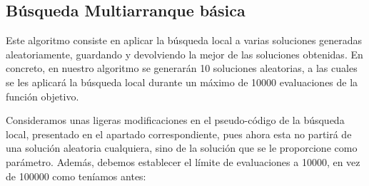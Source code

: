 \documentclass[11pt,a4paper]{article}
\begin{document}
\subsection{Búsqueda Multiarranque básica}

Este algoritmo consiste en aplicar la búsqueda local a varias soluciones generadas aleatoriamente, guardando y devolviendo la mejor de las soluciones obtenidas. En concreto, en nuestro algoritmo se generarán 10 soluciones aleatorias, a las cuales se les aplicará la búsqueda local durante un máximo de 10000 evaluaciones de la función objetivo. 

Consideramos unas ligeras modificaciones en el pseudo-código de la búsqueda local, presentado en el apartado correspondiente, pues ahora esta no partirá de una solución aleatoria cualquiera, sino de la solución que se le proporcione como parámetro. Además, debemos establecer el límite de evaluaciones a 10000, en vez de 100000 como teníamos antes:
\end{document}
